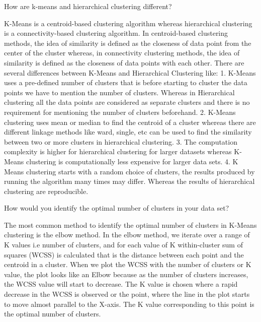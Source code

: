 	\begin{qanda}
		\begin{question}
How are k-means and hierarchical clustering different?
		\end{question}
		\begin{answer}
K-Means is a centroid-based clustering algorithm whereas hierarchical clustering is a connectivity-based clustering algorithm. In centroid-based clustering methods, the idea of similarity is defined as the closeness of data point from the center of the cluster whereas, in connectivity clustering methods, the idea of similarity is defined as the closeness of data points with each other. There are several differences between K-Means and Hierarchical Clustering like: 1. K-Means uses a pre-defined number of clusters that is before starting to cluster the data points we have to mention the number of clusters. Whereas in Hierarchical clustering all the data points are considered as separate clusters and there is no requirement for mentioning the number of clusters beforehand. 2. K-Means clustering uses mean or median to find the centroid of a cluster whereas there are different linkage methods like ward, single, etc can be used to find the similarity between two or more clusters in hierarchical clustering. 3. The computation complexity is higher for hierarchical clustering for larger datasets whereas K-Means clustering is computationally less expensive for larger data sets. 4. K Means clustering starts with a random choice of clusters, the results produced by running the algorithm many times may differ. Whereas the results of hierarchical clustering are reproducible.
		\end{answer}
	\end{qanda}

	\begin{qanda}
		\begin{question}
How would you identify the optimal number of clusters in your data set?
		\end{question}
		\begin{answer}
The most common method to identify the optimal number of clusters in K-Means clustering is the elbow method. In the elbow method, we iterate over a range of K values i.e number of clusters, and for each value of K within-cluster sum of squares (WCSS) is calculated that is the distance between each point and the centroid in a cluster. When we plot the WCSS with the number of clusters or K value, the plot looks like an Elbow because as the number of clusters increases, the WCSS value will start to decrease. The K value is chosen where a rapid decrease in the WCSS is observed or the point, where the line in the plot starts to move almost parallel to the X-axis. The K value corresponding to this point is the optimal number of clusters.
		\end{answer}
	\end{qanda}

